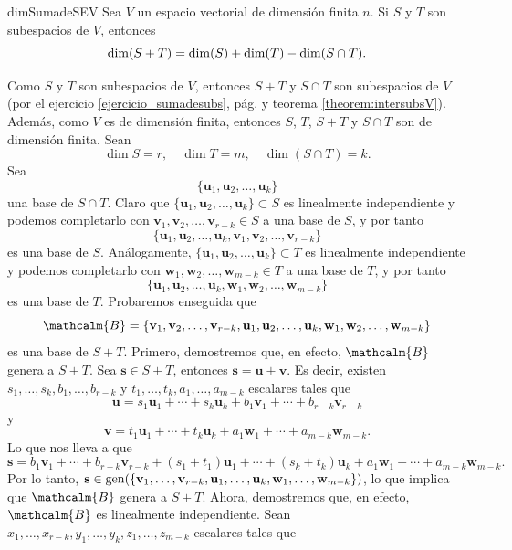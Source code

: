 \begin{theorem}{}{dimSumadeSEV}
    Sea $V$ un espacio vectorial de dimensión finita $n$. Si $S$ y $T$ son subespacios de $V$, entonces
    $$\operatorname{dim} (S + T) = \operatorname{dim}(S) + \operatorname{dim}(T) - \operatorname{dim}(S \cap T).$$

    \tcblower
    \demostracion Como $S$ y $T$ son subespacios de $V$, entonces $S + T$ y $S \cap T$ son subespacios de $V$ (por el ejercicio \ref{ejercicio_sumadesubs}, pág. \pageref{ejercicio_sumadesubs} y teorema \ref{theorem:intersubsV}). Además, como $V$ es de dimensión finita, entonces $S$, $T$, $S + T$ y $S \cap T$ son de dimensión finita. Sean
    $$\dim S = r, \quad \dim T = m, \quad \dim (S \cap T) = k.$$
    Sea
    $$\{\mathbf{u}_1, \mathbf{u}_2, \dots, \mathbf{u}_k\}$$
    una base de $S \cap T$. Claro que $\{\mathbf{u}_1, \mathbf{u}_2, \dots, \mathbf{u}_k\} \subset S$ es linealmente independiente y podemos completarlo con $\mathbf{v}_1, \mathbf{v}_2, \dots, \mathbf{v}_{r-k} \in S$ a una base de $S$, y por tanto
    $$\{\mathbf{u}_1, \mathbf{u}_2, \dots, \mathbf{u}_k, \mathbf{v}_1, \mathbf{v}_2, \dots, \mathbf{v}_{r-k}\}$$
    es una base de $S$. Análogamente, $\{\mathbf{u}_1, \mathbf{u}_2, \dots, \mathbf{u}_k\} \subset T$ es linealmente independiente y podemos completarlo con $\mathbf{w}_1, \mathbf{w}_2, \dots, \mathbf{w}_{m-k} \in T$ a una base de $T$, y por tanto
    $$\{\mathbf{u}_1, \mathbf{u}_2, \dots, \mathbf{u}_k, \mathbf{w}_1, \mathbf{w}_2, \dots, \mathbf{w}_{m-k}\}$$
    es una base de $T$. Probaremos enseguida que
    $$\mathcalm{B} = \{\mathbf{v}_1, \mathbf{v}_2, \dots, \mathbf{v}_{r-k}, \mathbf{u}_1, \mathbf{u}_2, \dots, \mathbf{u}_k, \mathbf{w}_1, \mathbf{w}_2, \dots, \mathbf{w}_{m-k}\}$$
    es una base de $S + T$. Primero, demostremos que, en efecto, $\mathcalm{B}$ genera a $S + T$. Sea $\mathbf{s} \in S + T$, entonces $\mathbf{s} = \mathbf{u} + \mathbf{v}$. Es decir, existen $s_1, \dots, s_k, b_1, \dots, b_{r-k}$ y $t_1, \dots, t_k, a_1, \dots, a_{m-k}$ escalares tales que
    $$\mathbf{u} = s_1 \mathbf{u}_1 + \cdots + s_k \mathbf{u}_k + b_1 \mathbf{v}_1 + \cdots + b_{r-k} \mathbf{v}_{r-k}$$
    y
    $$\mathbf{v} = t_1 \mathbf{u}_1 + \cdots + t_k \mathbf{u}_k + a_1 \mathbf{w}_1 + \cdots + a_{m-k} \mathbf{w}_{m-k}.$$
    Lo que nos lleva a que
    $$\mathbf{s} = b_1 \mathbf{v}_1 + \cdots + b_{r-k} \mathbf{v}_{r-k} + (s_1 + t_1)\mathbf{u}_1 + \cdots + (s_k + t_k)\mathbf{u}_k + a_1 \mathbf{w}_1 + \cdots + a_{m-k} \mathbf{w}_{m-k}.$$
    Por lo tanto, $\mathbf{s} \in \operatorname{gen} (\{\mathbf{v}_1, \dots, \mathbf{v}_{r-k}, \mathbf{u}_1, \dots, \mathbf{u}_k, \mathbf{w}_1, \dots, \mathbf{w}_{m-k}\})$, lo que implica que $\mathcalm{B}$ genera a $S + T$. Ahora, demostremos que, en efecto, $\mathcalm{B}$ es linealmente independiente. Sean $x_1, \dots, x_{r-k}, y_1, \dots, y_k, z_1, \dots, z_{m-k}$ escalares tales que

\end{theorem}
